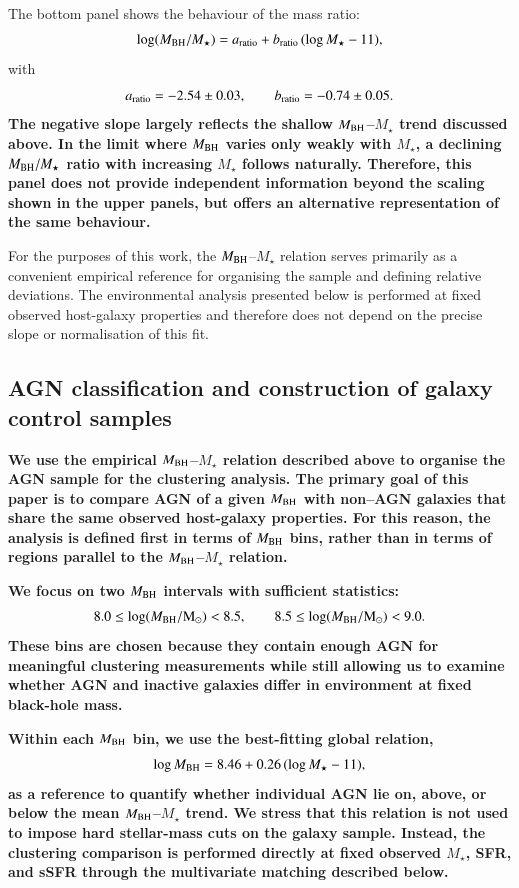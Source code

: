 \documentclass{aa}
\begin{document}
The bottom panel shows the behaviour of the mass ratio:
\begin{equation}
\log(M_{\rm BH}/M_{\star}) = a_{\rm ratio} + b_{\rm ratio}\,(\log M_{\star}-11),
\end{equation}
with
\begin{equation}
a_{\rm ratio} = -2.54 \pm 0.03,\qquad
b_{\rm ratio} = -0.74 \pm 0.05.
\end{equation}
\textbf{The negative slope largely reflects the shallow $M_{\rm BH}$--$M_\star$ trend discussed above. 
In the limit where $M_{\rm BH}$ varies only weakly with $M_\star$, a declining $M_{\rm BH}/M_\star$ ratio with increasing $M_\star$ follows naturally. Therefore, this panel does not provide independent information beyond the scaling shown in the upper panels, but offers an alternative representation of the same behaviour.}

For the purposes of this work, the $M_{\rm BH}$--$M_\star$ relation serves primarily as a convenient empirical reference for organising the sample and defining relative deviations. The environmental analysis presented below is performed at fixed observed host-galaxy properties and therefore does not depend on the precise slope or normalisation of this fit.



\subsection{AGN classification and construction of galaxy control samples}
\label{sec:classification_controls}

\textbf{We use the empirical $M_{\rm BH}$--$M_\star$ relation described above to organise the AGN sample for the clustering analysis. The primary goal of this paper is to compare AGN of a given  $M_{\rm BH}$ with non--AGN galaxies that share the same observed host-galaxy properties. For this reason, the analysis is defined first in terms of $M_{\rm BH}$ bins, rather than in terms of regions parallel to the $M_{\rm BH}$--$M_\star$ relation.}

\textbf{We focus on two $M_{\rm BH}$ intervals with sufficient statistics:
\[
8.0 \le \log(M_{\rm BH}/{\rm M_\odot}) < 8.5,
\qquad
8.5 \le \log(M_{\rm BH}/{\rm M_\odot}) < 9.0.
\]
These bins are chosen because they contain enough AGN for meaningful clustering measurements while still allowing us to examine whether AGN and inactive galaxies differ in environment at fixed black-hole mass.}

\textbf{Within each $M_{\rm BH}$ bin, we use the best-fitting global relation,
\begin{equation}
\log M_{\rm BH} = 8.46 + 0.26\,(\log M_\star - 11),
\end{equation}
as a reference to quantify whether individual AGN lie on, above, or below the mean $M_{\rm BH}$--$M_\star$ trend. We stress that this relation is not used to impose hard stellar-mass cuts on the galaxy sample. Instead, the clustering comparison is performed directly at fixed observed $M_\star$, SFR, and sSFR through the multivariate matching described below.}
\end{document}
